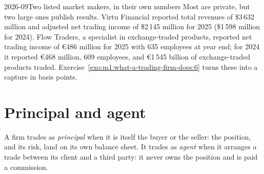 \begin{omfigure}

\end{omfigure}

\begin{dated}{2026-09}{Two listed market makers, in their own numbers}\label{dat:m1:what-a-trading-firm-does:listed}
Most  are private, but two large ones publish results.
Virtu Financial reported total revenues of \$3\,632 million and adjusted net
trading income of \$2\,145 million for 2025 (\$1\,598 million for 2024).
Flow Traders, a specialist in exchange-traded products, reported net trading
income of \euro 486 million for 2025 with 635 employees at year end; for 2024
it reported \euro 468 million, 609 employees, and \euro 1\,545 billion of
exchange-traded products traded. Exercise~\ref{exo:m1:what-a-trading-firm-does:6}
turns these into a capture in basis points.
\end{dated}

\section{Principal and agent}

\begin{definition}\label{def:m1:what-a-trading-firm-does:principal-agent}
A firm trades as \emph{principal} when it is itself the
buyer or the seller: the position, and its risk, land on its own balance
sheet. It trades as \emph{agent} when it arranges a trade
between its client and a third party: it never owns the position and is paid
a commission.
\end{definition}

